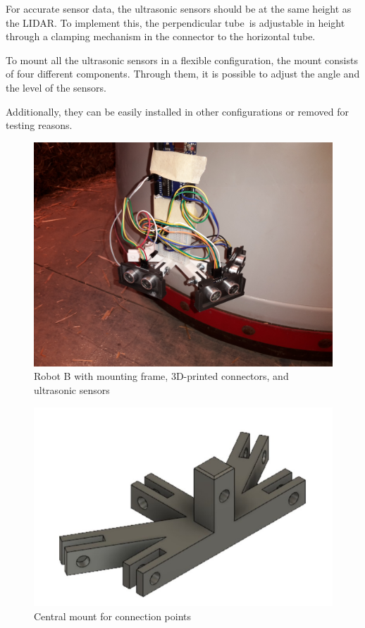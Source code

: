 \documentclass[11pt]{article}
\begin{document}
	For accurate sensor data, the ultrasonic sensors should be at the same height as the LIDAR. To implement this, the perpendicular tube is adjustable in height through a clamping mechanism in the connector to the horizontal tube. \newline
	
	To mount all the ultrasonic sensors in a flexible configuration, the mount consists of four different components. Through them, it is possible to adjust the angle and the level of the sensors. \newline
	
	Additionally, they can be easily installed in other configurations or removed for testing reasons.
	
	\begin{figure}[h!]
		\centering
		\includegraphics[scale=0.1]{ultrasonic_mount}
		\caption{Robot B with mounting frame, 3D-printed connectors, and ultrasonic sensors}
	\end{figure}
	
	\begin{figure}[h!]
		\centering
		\includegraphics[scale=0.5]{central_mount_empty}
		\caption{Central mount for connection points}
	\end{figure}
\end{document}
